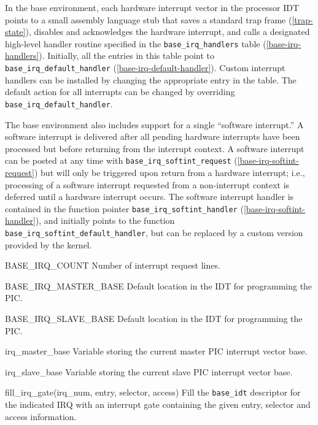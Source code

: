 \label{kern-x86pc-base-irq}

In the base environment,
each hardware interrupt vector in the processor IDT
points to a small assembly language stub
that saves a standard trap frame (\ref{trap-state}),
disables and acknowledges the hardware interrupt,
and calls a designated high-level handler routine specified
in the {\tt base_irq_handlers} table (\ref{base-irq-handlers}).
Initially, all the entries in this table point to
{\tt base_irq_default_handler} (\ref{base-irq-default-handler}).
Custom interrupt handlers can be installed by changing
the appropriate entry in the table.
The default action for all interrupts can be changed by overriding
{\tt base_irq_default_handler}.

The base environment also includes support for a single
``software interrupt.''  A software interrupt is delivered
after all pending hardware interrupts have been processed but
before returning from the interrupt context.  A software
interrupt can be posted at any time with
{\tt base_irq_softint_request} (\ref{base-irq-softint-request})
but will only be triggered upon return from a hardware interrupt;
i.e., processing of a software interrupt requested from a
non-interrupt context is deferred until a hardware interrupt occurs.
The software interrupt handler is contained in the function pointer
{\tt base_irq_softint_handler} (\ref{base-irq-softint-handler}), and
initially points to the function {\tt base_irq_softint_default_handler},
but can be replaced by a custom version provided by the kernel.

\label{base-irq-h}
\begin{apisyn}
\end{apisyn}
\begin{apidesc}
	\begin{csymlist}
	\item[BASE_IRQ_COUNT]		
		Number of interrupt request lines.
	\item[BASE_IRQ_MASTER_BASE]	
		Default location in the IDT for programming the PIC.
	\item[BASE_IRQ_SLAVE_BASE]	
		Default location in the IDT for programming the PIC.
	\item[irq_master_base]		
		Variable storing the current master PIC interrupt vector base.
	\item[irq_slave_base]		
		Variable storing the current slave PIC interrupt vector base.
	\item[fill_irq_gate(irq_num, entry, selector, access)]
		Fill the {\tt base_idt} descriptor for the indicated IRQ
		with an interrupt gate containing the given entry,
		selector and access information.
	\end{csymlist}
\end{apidesc}

